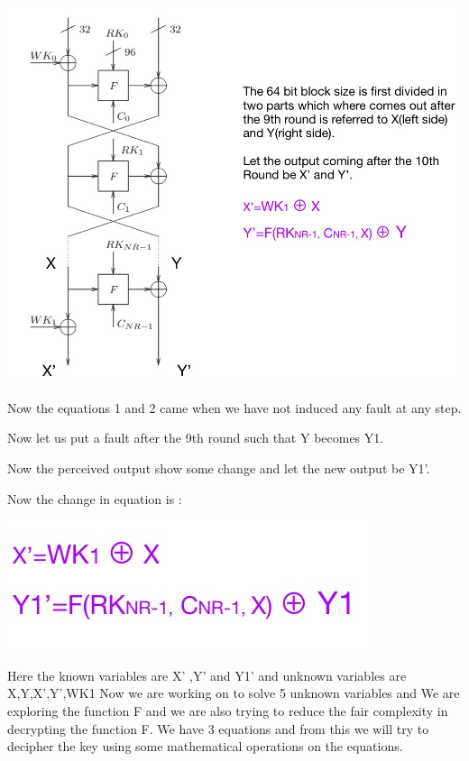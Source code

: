 \section*{\fontsize{25}{29}\selectfont{\textbf Contribution} \\}

\includegraphics[scale=0.5]{project/images/7.jpg}

Now the equations 1 and 2 came when we have not induced any fault at any step.

Now let us put a fault after the 9th round such that Y becomes Y1.

Now the perceived output show some change and let the new output be Y1’.

Now the change in equation is :

\includegraphics[scale=0.5]{project/images/8.jpg}

Here the known variables are X’ ,Y’ and Y1’
and unknown variables are X,Y,X’,Y’,WK1
Now we are working on to solve 5 unknown variables and We are exploring the function F and we are also trying to reduce the  fair complexity in decrypting the function F. We have 3 equations and from this we will try to decipher the key using some mathematical operations on the equations.

